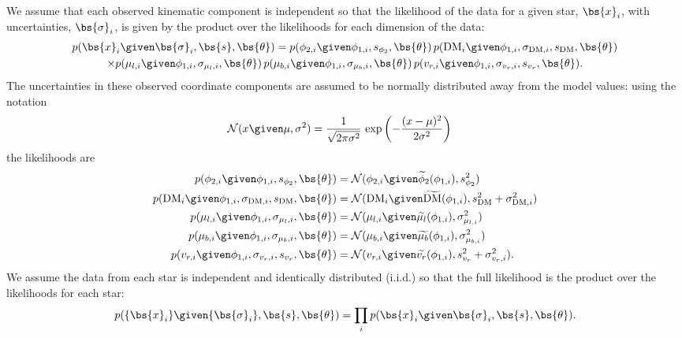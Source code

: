 \documentclass[letterpaper,12pt,preprint]{aastex}
\newcommand{\DM}{{\rm DM}}
\newcommand{\norm}{\mathcal{N}}
\begin{document}
We assume that each observed kinematic component is independent so that the likelihood of the data for a given star, $\bs{x}_i$, with uncertainties, $\bs{\sigma}_i$, is given by the product over the likelihoods for each dimension of the data:
\begin{multline}
	p(\bs{x}_i \given \bs{\sigma}_i, \bs{s}, \bs{\theta}) = p(\phi_{2,i} \given \phi_{1,i}, s_{\phi_2},\bs{\theta}) \, p(\DM_i \given \phi_{1,i}, \sigma_{\DM,i}, s_\DM, \bs{\theta})\\ 
	\times p(\mu_{l,i} \given \phi_{1,i}, \sigma_{\mu_{l},i}, \bs{\theta}) \, p(\mu_{b,i} \given \phi_{1,i}, \sigma_{\mu_{b},i}, \bs{\theta}) \, p(v_{r,i} \given \phi_{1,i}, \sigma_{v_r,i}, s_{v_r}, \bs{\theta}).
\end{multline}
The uncertainties in these observed coordinate components are assumed to be normally distributed away from the model values: using the notation
\begin{align}
	\norm(x \given \mu, \sigma^2) &= \frac{1}{\sqrt{2\pi \sigma^2}} \, \exp\left(-\frac{(x-\mu)^2}{2\sigma^2}\right)
\end{align}
the likelihoods are
\begin{align}	
	p(\phi_{2,i} \given \phi_{1,i}, s_{\phi_2},\bs{\theta}) &= \norm(\phi_{2,i} \given \widetilde{\phi}_{2}(\phi_{1,i}), s^2_{\phi_2})\\
	p(\DM_i \given \phi_{1,i}, \sigma_{\DM,i}, s_\DM, \bs{\theta}) &= \norm(\DM_i \given \widetilde{\DM}(\phi_{1,i}), s^2_{\DM} + \sigma^2_{\DM,i})\\
	p(\mu_{l,i} \given \phi_{1,i}, \sigma_{\mu_{l},i}, \bs{\theta}) &= \norm(\mu_{l,i} \given \widetilde{\mu_{l}}(\phi_{1,i}), \sigma^2_{\mu_{l,i}})\\
	p(\mu_{b,i} \given \phi_{1,i}, \sigma_{\mu_{b},i}, \bs{\theta}) &= \norm(\mu_{b,i} \given \widetilde{\mu_{b}}(\phi_{1,i}), \sigma^2_{\mu_{b,i}})\\
	p(v_{r,i} \given \phi_{1,i}, \sigma_{v_r,i}, s_{v_r}, \bs{\theta}) &= \norm(v_{r,i} \given \widetilde{v_r}(\phi_{1,i}), s^2_{v_r} + \sigma^2_{v_r,i}).
\end{align}
We assume the data from each star is independent and identically distributed (i.i.d.) so that the full likelihood is the product over the likelihoods for each star:
\begin{equation}
	 p(\{\bs{x}_i\} \given \{\bs{\sigma}_i\}, \bs{s}, \bs{\theta}) = \prod_i p(\bs{x}_i \given \bs{\sigma}_i, \bs{s}, \bs{\theta}).\label{eq:likelihood}
\end{equation}
\end{document}
